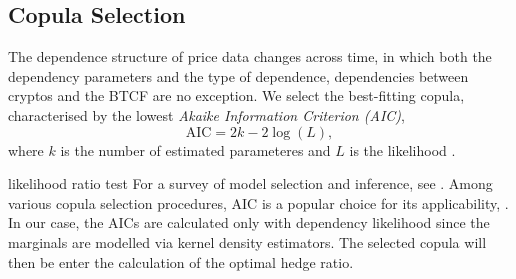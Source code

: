 
\subsection{Copula Selection}\label{subsec:copula-selection}



The dependence structure of price data changes across time, in which
both the dependency parameters and the type of dependence,
dependencies between cryptos and the BTCF are no exception. \natp{\em [?]}
We select the best-fitting copula, characterised by the lowest {\em Akaike Information Criterion (AIC)},
\begin{equation*}
 \text{AIC} = 2k- 2 \log(L),
\end{equation*}
where $k$ is the number of estimated
parameteres and $L$ is the likelihood \citep{Akaike1973}. 

 likelihood ratio test 
For a survey of model selection and inference, see \cite{anderson1998comparison}.
Among various copula selection procedures, AIC is a popular choice for
its applicability, .
In our case, the AICs are calculated only with dependency likelihood
since the marginals are modelled via kernel density estimators.
The selected copula will then be enter the calculation of the optimal
hedge ratio.


